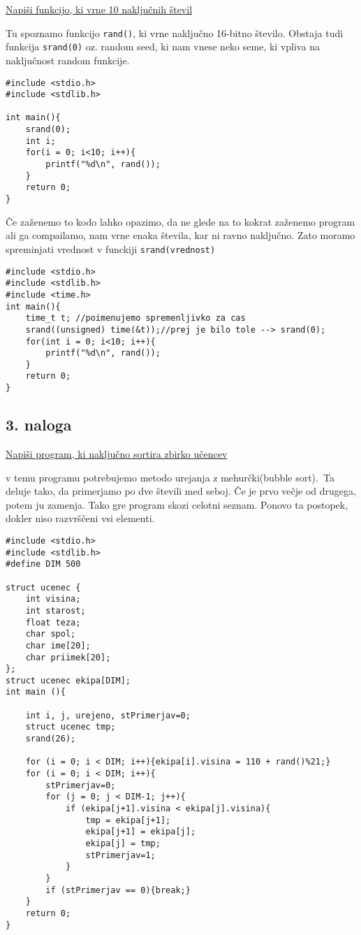 \documentclass[a4paper, 12pt]{article}
\begin{document}
\underline{Napiši funkcijo, ki vrne 10 naključnih števil}

Tu spoznamo funkcijo \lstinline|rand()|, ki vrne naključno 16-bitno število. Obstaja tudi funkcija \lstinline|srand(0)| oz. random seed, ki nam vnese neko seme, ki vpliva na naključnost random funkcije.

\begin{lstlisting}
#include <stdio.h>
#include <stdlib.h>

int main(){
	srand(0);
	int i;
	for(i = 0; i<10; i++){
		printf("%d\n", rand());
	}
	return 0;
}
\end{lstlisting}

Če zaženemo to kodo lahko opazimo, da ne glede na to kokrat zaženemo program ali ga compailamo, nam vrne enaka števila, kar ni ravno naključno. Zato moramo spreminjati vrednost v funckiji \lstinline|srand(vrednost)|

\begin{lstlisting}
#include <stdio.h>
#include <stdlib.h>
#include <time.h>
int main(){
	time_t t; //poimenujemo spremenljivko za cas
	srand((unsigned) time(&t));//prej je bilo tole --> srand(0);
	for(int i = 0; i<10; i++){
		printf("%d\n", rand());
	}
	return 0;
}
\end{lstlisting}

\subsection*{3. naloga}
	
\underline{Napiši program, ki naključno sortira zbirko učencev}

v temu programu potrebujemo metodo urejanja z mehurčki(bubble sort).\
Ta deluje tako, da primerjamo po dve števili med seboj. Če je prvo večje od drugega, potem ju zamenja. Tako gre program skozi celotni seznam. Ponovo ta postopek, dokler niso razvrščeni vsi elementi.

\begin{lstlisting}
#include <stdio.h>
#include <stdlib.h>
#define DIM 500

struct ucenec {
	int visina;
	int starost;
	float teza;
	char spol;
	char ime[20];
	char priimek[20];
};
struct ucenec ekipa[DIM];
int main (){

	int i, j, urejeno, stPrimerjav=0;
	struct ucenec tmp;
	srand(26);
	
	for (i = 0; i < DIM; i++){ekipa[i].visina = 110 + rand()%21;}
	for (i = 0; i < DIM; i++){
		stPrimerjav=0;
		for (j = 0; j < DIM-1; j++){
			if (ekipa[j+1].visina < ekipa[j].visina){
				tmp = ekipa[j+1];
				ekipa[j+1] = ekipa[j];
				ekipa[j] = tmp;
				stPrimerjav=1;
			}
		}
		if (stPrimerjav == 0){break;}	
	}
	return 0;
}
\end{lstlisting}
\end{document}
